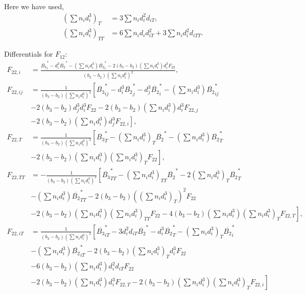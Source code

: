 \documentclass[english]{../thermomemo/thermomemo}
\newcommand*{\lb}{\left(}
\newcommand*{\rb}{\right)}
\begin{document}
Here we have used,
\begin{align}
  \label{eq:diff_help}
    \lb \sum n_i d_i^3 \rb_T  &= 3 \sum n_i d_i^2 d_{iT}, \\
    \lb \sum n_i d_i^3 \rb_{TT}  &= 6 \sum n_i d_i d_{iT}^2 + 3 \sum n_i d_i^2 d_{iTT}.
\end{align}

Differentials for $F_{12}$:
\begin{align}
  \label{eq:F22_diff}
    F_{22,i}  &=  \frac{\overline{B_3}^*_i - d_i^3  \overline{B_2}^* - \lb \sum n_i d_i^3 \rb  \overline{B_2}^*_i - 2\lb b_3-b_2\rb \lb \sum n_i d_i^3 \rb d_i^3 F_{22}}{\lb b_3-b_2\rb \lb \sum n_i d_i^3 \rb^2}, \\
    F_{22,ij}  &=  \frac{1}{\lb b_3-b_2\rb \lb \sum n_i d_i^3 \rb^2}
    \left[\overline{B_3}^*_{ij}  -  d_i^3  \overline{B_2}^*_j - d_j^3  \overline{B_2}^*_i - \lb \sum n_i d_i^3 \rb  \overline{B_2}^*_{ij} \right. \nonumber \\ &- 2\lb b_3-b_2\rb d_j^3 d_i^3 F_{22} - 2\lb b_3-b_2\rb \lb \sum n_i d_i^3 \rb d_i^3 F_{22,j} \nonumber \\ & \left.- 2\lb b_3-b_2\rb \lb \sum n_i d_i^3 \rb d_j^3 F_{22,i} \right],\\
    F_{22,T} &=  \frac{1}{\lb b_3-b_2\rb \lb \sum n_i d_i^3 \rb^2} \left[\overline{B_3}^*_T - \lb \sum n_i d_i^3 \rb_T  \overline{B_2}^* - \lb \sum n_i d_i^3 \rb  \overline{B_2}^*_T  \right. \nonumber \\ & \left. - 2\lb b_3-b_2\rb \lb \sum n_i d_{i}^3 \rb \lb \sum n_i d_{i}^3 \rb_T F_{22} \right] , \\
    F_{22,TT} &= - \frac{1}{\lb b_3-b_2\rb \lb \sum n_i d_i^3 \rb^2} \left[\overline{B_3}^*_{TT} - \lb \sum n_i d_i^3 \rb_{TT}  \overline{B_2}^* - 2\lb \sum n_i d_i^3 \rb_T  \overline{B_2}^*_T \right. \nonumber \\
      & - \lb \sum n_i d_i^3 \rb  \overline{B_2}^*_{TT} - 2\lb b_3-b_2\rb \lb \lb \sum n_i d_{i}^3 \rb_T \rb^2 F_{22} \nonumber \\ & \left. - 2\lb b_3-b_2\rb \lb \sum n_i d_{i}^3 \rb \lb \sum n_i d_{i}^3 \rb_{TT} F_{22} - 4\lb b_3-b_2\rb \lb \sum n_i d_{i}^3 \rb \lb \sum n_i d_{i}^3 \rb_T F_{22,T} \right], \\
  F_{22,iT}  &= \frac{1}{\lb b_3-b_2\rb \lb \sum n_i d_i^3 \rb^2} \left[\overline{B_3}^*_{iT} -3d_i^2 d_{iT}  \overline{B_2}^* -  d_i^3  \overline{B_2}^*_T - \lb \sum n_i d_i^3 \rb_T  \overline{B_2}^*_i \right. \nonumber \\ & - \lb \sum n_i d_i^3 \rb  \overline{B_2}^*_{iT} - 2\lb b_3-b_2\rb \lb \sum n_i d_i^3 \rb_T d_i^3 F_{22} \nonumber \\ &- 6\lb b_3-b_2\rb \lb \sum n_i d_i^3 \rb d_i^2 d_{iT} F_{22} \nonumber \\ & \left.- 2\lb b_3-b_2\rb \lb \sum n_i d_i^3 \rb d_i^3 F_{22,T} - 2 \lb b_3-b_2\rb \lb \sum n_i d_i^3 \rb \lb \sum n_i d_i^3 \rb_T F_{22,i} \right]
\end{align}
\end{document}
